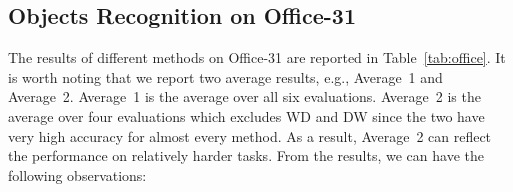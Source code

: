 \documentclass[sigconf]{acmart}
\begin{document}
\begin{table*}[ht!p]
\centering
\caption{Domain adaptation results (accuracy~\%) on Office-31. Where average~1 is the overall average and average~2 is the average over 4 challenging evaluations except for WD and DW. The best results are highlighted by bold numbers.}
\vspace{-8pt}
\label{tab:office}
\end{table*}







\subsection{Objects Recognition on Office-31}
The results of different methods on Office-31 are reported in Table~\ref{tab:office}. It is worth noting that we report two average results, e.g., Average~1 and Average~2. Average~1 is the average over all six evaluations. Average~2 is the average over four evaluations which excludes WD and DW since the two have very high accuracy for almost every method. As a result, Average~2 can reflect the performance on relatively harder tasks. From the results, we can have the following observations:
\end{document}
